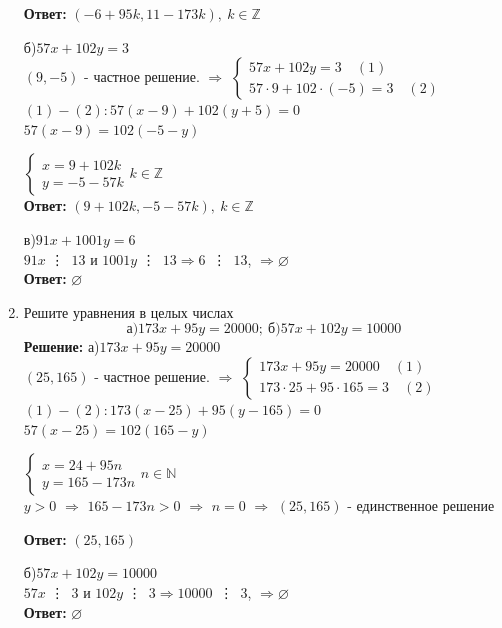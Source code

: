 \documentclass[]{book}
\theoremstyle{definition}
\newcommand{\bb}[1]{\mathbb{#1}}
\begin{document}
\begin{enumerate}
\textbf{Ответ: } $(-6+95k, 11-173k),\: k\in\bb{Z}$

б)$57x + 102y = 3$\\
$(9,-5)$ - частное решение. $\Longrightarrow$
$
\begin{cases}
   57x + 102y = 3 \quad (1) \\
   57\cdot 9 + 102\cdot (-5) = 3\quad (2)
 \end{cases}
$
\\

$(1) - (2): 57(x-9) + 102(y+5) = 0$\\
$57(x-9) = 102(-5-y)$
 
$
\begin{cases}
   x = 9 + 102k \\
   y = -5 - 57k
\end{cases}
k\in\bb{Z}$ \\

\textbf{Ответ: } $(9+102k, -5 - 57k),\: k\in\bb{Z}$

в)$91x + 1001y = 6$\\
$91x$ \vdots\ $13$ и $1001y$ \vdots\ $13 \Longrightarrow 6$\ \vdots\ $13$,  $\Rightarrow \varnothing$\\
\textbf{Ответ: } $\varnothing$

\item Решите уравнения в целых числах
$$ \text{а)}173x + 95y = 20000;\ \text{б)}57x + 102y = 10000$$
\textbf{Решение:}
а)$173x + 95y = 20000$\\
$(25,165)$ - частное решение. $\Longrightarrow$
$
\begin{cases}
   173x + 95y = 20000 \quad (1) \\
   173\cdot 25 + 95\cdot 165 = 3\quad (2)
 \end{cases}
$
\\

$(1) - (2): 173(x-25) + 95(y-165) = 0$\\
$57(x-25) = 102(165-y)$
 
$
\begin{cases}
   x = 24 + 95n \\
   y = 165 - 173n
\end{cases}
n\in\bb{N}$ \\
$y>0$ $\Longrightarrow$ $165 - 173n >0$ $\Longrightarrow$ $n = 0$ $\Longrightarrow$ $(25, 165)$ - единственное решение

\textbf{Ответ: } $(25, 165)$

б)$57x + 102y = 10000$\\
$57x$ \vdots\ $3$ и $102y$ \vdots\ $3 \Longrightarrow 10000$\ \vdots\ $3$,  $\Rightarrow \varnothing$\\
\textbf{Ответ: } $\varnothing$


\end{enumerate}
\end{document}
